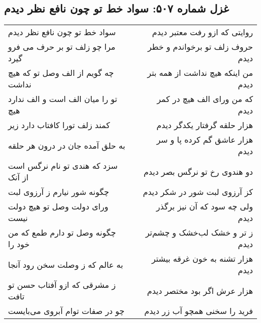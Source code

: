 \begin{center}
\section*{غزل شماره ۵۰۷: سواد خط تو چون نافع نظر دیدم}
\label{sec:507}
\begin{longtable}{l p{0.5cm} r}
سواد خط تو چون نافع نظر دیدم
&&
روایتی که ازو رفت معتبر دیدم
\\
مرا چو زلف تو بر حرف می فرو گیرد
&&
حروف زلف تو برخواندم و خطر دیدم
\\
چه گویم از الف وصل تو که هیچ نداشت
&&
من اینکه هیچ نداشت از همه بتر دیدم
\\
تو را میان الف است و الف ندارد هیچ
&&
که من ورای الف هیچ در کمر دیدم
\\
کمند زلف تورا کافتاب دارد زیر
&&
هزار حلقه گرفتار یکدگر دیدم
\\
به حلق آمده جان در درون هر حلقه
&&
هزار عاشق گم کرده پا و سر دیدم
\\
سزد که هندی تو نام نرگس است از آنک
&&
دو هندوی رخ تو نرگس بصر دیدم
\\
چگونه شور نیارم ز آرزوی لبت
&&
کز آرزوی لبت شور در شکر دیدم
\\
ورای دولت وصل تو هیچ دولت نیست
&&
ولی چه سود که آن نیز برگذر دیدم
\\
چگونه وصل تو دارم طمع که من خود را
&&
ز تر و خشک لب‌خشک و چشم‌تر دیدم
\\
به عالم که ز وصلت سخن رود آنجا
&&
هزار تشنه به خون غرقه بیشتر دیدم
\\
ز مشرقی که ازو آفتاب حسن تو تافت
&&
هزار عرش اگر بود مختصر دیدم
\\
چو در صفات توام آبروی می‌بایست
&&
فرید را سخنی همچو آب زر دیدم
\\
\end{longtable}
\end{center}
